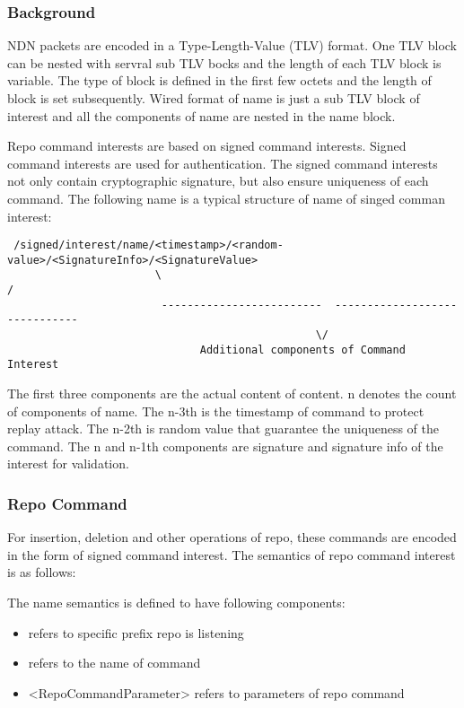 \documentclass{acm_proc_article-sp}
\begin{document}
\subsubsection{Background}
NDN packets are encoded in a Type-Length-Value (TLV) format. One TLV block can be nested with servral sub TLV bocks and the length of each TLV block is variable. The type of block is defined in the first few octets and the length of block is set subsequently. Wired format of name is just a sub TLV block of interest and all the components of name are nested in the name block.

Repo command interests are based on signed command interests. Signed command interests are used for authentication. The signed command interests not only contain cryptographic signature, but also ensure uniqueness of each command. The following name is a typical structure of name of singed comman interest:

\begin{figure*}[htbp]
\centering
\begin{framed}
\begin{BVerbatim}
 /signed/interest/name/<timestamp>/<random-value>/<SignatureInfo>/<SignatureValue>
                       \                                                         /
                        -------------------------  ------------------------------
                                                \/
                              Additional components of Command Interest 
\end{BVerbatim}
\end{framed}
\end{figure*}

The first three components are the actual content of content. n denotes the count of components of name. The n-3th is the timestamp of command to protect replay attack. The n-2th is random value that guarantee the uniqueness of the command. The n and n-1th components are signature and signature info of the interest for validation.

\subsubsection{Repo Command}
For insertion, deletion and other operations of repo, these commands are encoded in the form of signed command interest. The semantics of repo command interest is as follows:

The name semantics is defined to have following components:
\begin{itemize}
\item <repo prefix> refers to specific prefix repo is listening
\item <command verb> refers to the name of command
\item <RepoCommandParameter> refers to parameters of repo command
\end{itemize}
\end{document}
